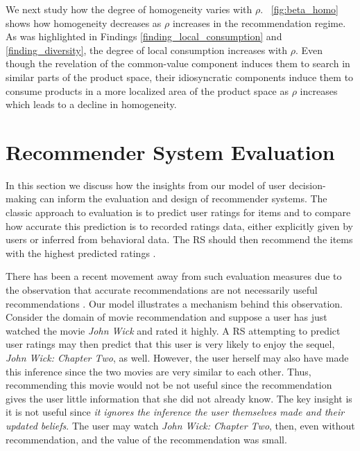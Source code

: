 \documentclass[manuscript]{acmart}
\begin{document}
We next study how the degree of homogeneity varies with $\rho$. ~\autoref{fig:beta_homo} shows how homogeneity decreases as $\rho$ increases in the recommendation regime. As was highlighted in Findings \ref{finding_local_consumption} and \ref{finding_diversity}, the degree of local consumption increases with $\rho$. Even though the revelation of the common-value component induces them to search in similar parts of the product space, their idiosyncratic components induce them to consume products in a more localized area of the product space as $\rho$ increases which leads to a decline in homogeneity.

\section{Recommender System Evaluation}
In this section we discuss how the insights from our model of user decision-making can inform the evaluation and design of recommender systems. The classic approach to evaluation is to predict user ratings for items and to compare how accurate this prediction is to recorded ratings data, either explicitly given by users or inferred from behavioral data. The RS should then recommend the items with the highest predicted ratings \cite{adomavicius2005toward}.
\par
There has been a recent movement away from such evaluation measures due to the observation that accurate recommendations are not necessarily useful recommendations \cite{mcnee2006being}. Our model illustrates a mechanism behind this observation. Consider the domain of movie recommendation and suppose a user has just watched the movie \textit{John Wick} and rated it highly. A RS attempting to predict user ratings may then predict that this user is very likely to enjoy the sequel, \textit{John Wick: Chapter Two}, as well. However, the user herself may also have made this inference since the two movies are very similar to each other. Thus, recommending this movie would not be not useful since the recommendation gives the user little information that she did not already know. The key insight is it is not useful since \textit{it ignores the inference the user themselves made and their updated beliefs}. The user may watch \textit{John Wick: Chapter Two}, then, even without recommendation, and the value of the recommendation was small.
\par
\end{document}
